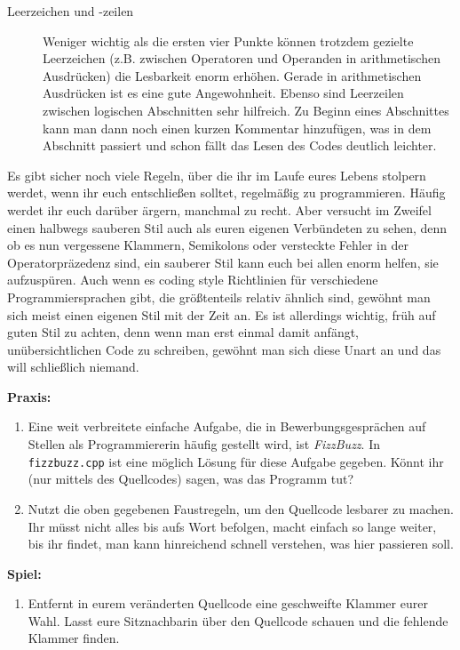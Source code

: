 \begin{description}
      \item[Leerzeichen und -zeilen]
            Weniger wichtig als die ersten vier Punkte können trotzdem gezielte
            Leerzeichen (z.B. zwischen Operatoren und Operanden in arithmetischen
            Ausdrücken) die Lesbarkeit enorm erhöhen. Gerade in arithmetischen
            Ausdrücken ist es eine gute Angewohnheit.
            Ebenso sind Leerzeilen zwischen logischen Abschnitten sehr hilfreich. Zu Beginn eines Abschnittes kann man dann noch einen kurzen Kommentar hinzufügen, was in dem Abschnitt passiert und schon fällt das Lesen des Codes deutlich leichter.
\end{description}

Es gibt sicher noch viele Regeln, über die ihr im Laufe eures Lebens stolpern
werdet, wenn ihr euch entschließen solltet, regelmäßig zu programmieren. Häufig
werdet ihr euch darüber ärgern, manchmal zu recht. Aber versucht im Zweifel
einen halbwegs sauberen Stil auch als euren eigenen Verbündeten zu sehen, denn
ob es nun vergessene Klammern, Semikolons oder versteckte Fehler in der
Operatorpräzedenz sind, ein sauberer Stil kann euch bei allen enorm helfen, sie
aufzuspüren. Auch wenn es coding style Richtlinien für verschiedene Programmiersprachen gibt, die größtenteils relativ ähnlich sind, gewöhnt man sich meist einen eigenen Stil mit der Zeit an. Es ist allerdings wichtig, früh auf guten Stil zu achten, denn wenn man erst einmal damit anfängt, unübersichtlichen Code zu schreiben, gewöhnt man sich diese Unart an und das will schließlich niemand.

\textbf{Praxis:}
\begin{enumerate}
      \item Eine weit verbreitete einfache Aufgabe, die in Bewerbungsgesprächen
            auf Stellen als Programmiererin häufig gestellt wird, ist
            \emph{FizzBuzz}. In \texttt{fizzbuzz.cpp} ist eine möglich Lösung für
            diese Aufgabe gegeben. Könnt ihr (nur mittels des Quellcodes) sagen,
            was das Programm tut?
      \item Nutzt die oben gegebenen Faustregeln, um den Quellcode lesbarer zu
            machen. Ihr müsst nicht alles bis aufs Wort befolgen, macht einfach so
            lange weiter, bis ihr findet, man kann hinreichend schnell verstehen,
            was hier passieren soll.
\end{enumerate}


\textbf{Spiel:}
\begin{enumerate}
      \item Entfernt in eurem veränderten Quellcode eine geschweifte Klammer
            eurer Wahl. Lasst eure Sitznachbarin über den Quellcode schauen und die
            fehlende Klammer finden.
\end{enumerate}
